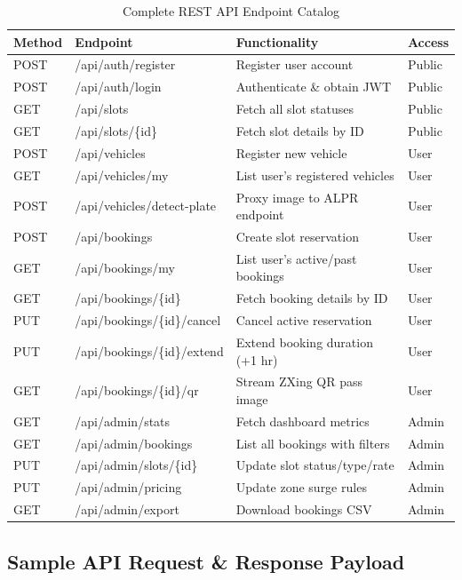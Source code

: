 \documentclass[conference,10pt]{IEEEtran}
\begin{document}
\begin{table}[ht]
\centering
\caption{Complete REST API Endpoint Catalog}
\label{tab:api}
\footnotesize
\setlength{\tabcolsep}{2.5pt}
\begin{tabular}{@{}l l L{3.2cm} l@{}}
\toprule
\textbf{Method} & \textbf{Endpoint} & \textbf{Functionality} & \textbf{Access} \\
\midrule
POST & /api/auth/register & Register user account & Public \\
POST & /api/auth/login & Authenticate \& obtain JWT & Public \\
\addlinespace
GET & /api/slots & Fetch all slot statuses & Public \\
GET & /api/slots/\{id\} & Fetch slot details by ID & Public \\
\addlinespace
POST & /api/vehicles & Register new vehicle & User \\
GET & /api/vehicles/my & List user's registered vehicles & User \\
POST & /api/vehicles/detect-plate & Proxy image to ALPR endpoint & User \\
\addlinespace
POST & /api/bookings & Create slot reservation & User \\
GET & /api/bookings/my & List user's active/past bookings & User \\
GET & /api/bookings/\{id\} & Fetch booking details by ID & User \\
PUT & /api/bookings/\{id\}/cancel & Cancel active reservation & User \\
PUT & /api/bookings/\{id\}/extend & Extend booking duration (+1 hr) & User \\
GET & /api/bookings/\{id\}/qr & Stream ZXing QR pass image & User \\
\addlinespace
GET & /api/admin/stats & Fetch dashboard metrics & Admin \\
GET & /api/admin/bookings & List all bookings with filters & Admin \\
PUT & /api/admin/slots/\{id\} & Update slot status/type/rate & Admin \\
PUT & /api/admin/pricing & Update zone surge rules & Admin \\
GET & /api/admin/export & Download bookings CSV & Admin \\
\bottomrule
\end{tabular}
\end{table}

\subsection{Sample API Request \& Response Payload}
\end{document}
